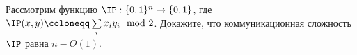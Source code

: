 Рассмотрим функцию $\IP: \{0, 1\}^n \to \{0, 1\}$, где $\IP(x, y) \coloneqq \sum\limits_{i} x_{i}y_{i} \mod 2$.
Докажите, что коммуникационная сложность $\IP$ равна $n - O(1)$.
